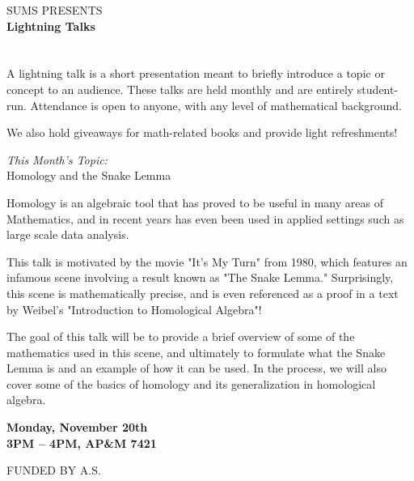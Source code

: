 \documentclass[12pt]{article}
\newcommand*\diff{\mathop{}\!\mathrm{d}}
\begin{document}
\pagestyle{empty} 
\thispagestyle{empty}


\centering
\huge
SUMS PRESENTS\\[0.4em]
\textbf{Lightning Talks}\\[0.4em]


\\[1.25em]

\large
\resizebox{\linewidth}{!}{$\displaystyle\int_{\mathbb{R}} e^{x^2} \diff{x} = \sqrt{\pi}$\hspace{0.3in}$\displaystyle\nabla \times E = -\frac{\partial \textbf{B}}{\partial t}$\hspace{0.3in}$\displaystyle \mathbb{R} / \mathbb{Z} \cong S^1$}\\[2em]
\Large
A lightning talk is a short presentation meant to briefly introduce a topic or concept to an audience. 
These talks are held monthly and are entirely student-run. Attendance is open to anyone, with any level of mathematical background.

We also hold giveaways for math-related books and provide light refreshments!


\Huge
\textit{This Month's Topic:}\\[0.4em]
\Large 
Homology and the Snake Lemma

\normalsize

Homology is an algebraic tool that has proved to be useful in many areas of Mathematics, and in recent years has even been used in applied settings such as large scale data analysis.

This talk is motivated by the movie "It's My Turn" from 1980, which features an infamous scene involving a result known as "The Snake Lemma." Surprisingly, this scene is mathematically precise, and is even referenced as a proof in a text by Weibel's "Introduction to Homological Algebra"!

The goal of this talk will be to provide a brief overview of some of the mathematics used in this scene, and ultimately to formulate what the Snake Lemma is and an example of how it can be used. In the process, we will also cover some of the basics of homology and its generalization in homological algebra.

\Large
\textbf{Monday, November 20th\\ 3PM -- 4PM, AP\&M 7421}\\[0.6em]

\begin{center}
\small
    FUNDED BY A.S.
\end{center}
\end{document}
